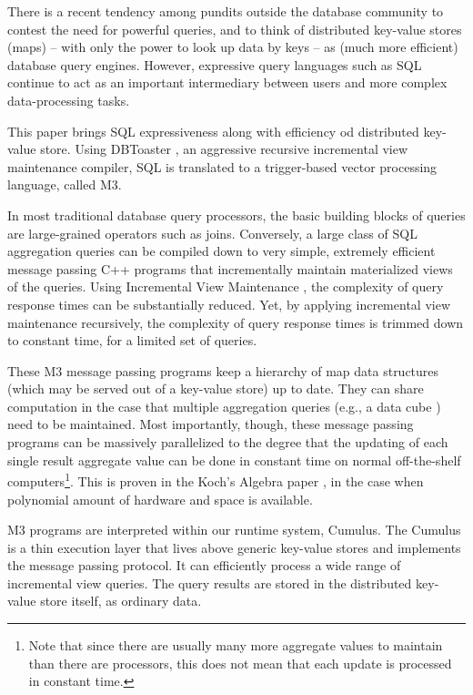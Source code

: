 \documentclass{sig-semester}
\def\M3{M3\xspace}
\begin{document}
There is a recent tendency among pundits outside the database community to contest the need for powerful queries, and to think of distributed key-value stores (maps) -- with only the power to look up data by keys -- as (much more efficient) database query engines. However, expressive query languages such as SQL continue to act as an important intermediary between users and more complex data-processing tasks. 

This paper brings SQL expressiveness along with efficiency od distributed key-value store. Using DBToaster \cite{SQLCompiler09}, an aggressive recursive incremental view maintenance compiler, SQL is translated to a trigger-based vector processing language, called \M3. 

In most traditional database query processors, the basic building blocks of queries are large-grained operators such as joins. Conversely, a large class of SQL aggregation queries can be compiled down to very simple, extremely efficient message passing C++ programs that incrementally maintain materialized views of the queries. Using Incremental View Maintenance \cite{Lee01}, the complexity of query response times can be substantially reduced. Yet, by applying incremental view maintenance recursively, the complexity of query response times is trimmed down to constant time, for a limited set of queries.

These \M3 message passing programs keep a hierarchy of map data structures (which may be served out of a key-value store) up to date. They can share computation in the case that multiple aggregation queries (e.g., a data cube \cite{datacube}) need to be maintained.  Most importantly, though, these message passing programs can be massively parallelized to the degree that the updating of each single result aggregate value can be done in constant time on normal off-the-shelf computers\footnote{Note that since there are usually many more aggregate values to maintain than there are processors,
this does not mean that each update is processed in constant time.}. This is proven in the Koch's Algebra paper \cite{KochAlgebra10}, in the case when polynomial amount of hardware and space is available.

\M3 programs are interpreted within our runtime system, Cumulus. The Cumulus is a thin execution layer that lives above generic key-value stores and implements the message passing protocol. It can efficiently process a wide range of incremental view queries. The query results are stored in the distributed key-value store itself, as ordinary data.
\end{document}
